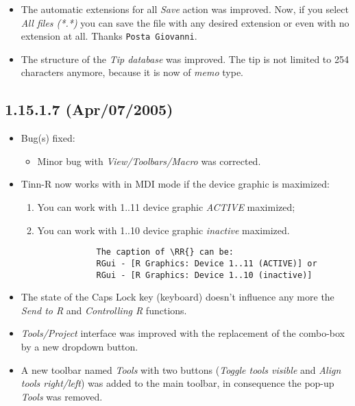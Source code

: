 \begin{itemize}
  \item The automatic extensions for all \textit{Save} action was
    improved. Now, if you select \textit{All files (*.*)} you can
    save the file with any desired extension or even with no
    extension at all. Thanks \texttt{Posta Giovanni}.
  \item The structure of the \textit{Tip database} was improved.
    The tip is not limited to 254 characters anymore, because it is
    now of \textit{memo} type.
\end{itemize}


\subsection*{1.15.1.7 (Apr/07/2005)}
\begin{itemize}
  \item Bug(s) fixed:
    \begin{itemize}
      \item Minor bug with \textit{View/Toolbars/Macro} was corrected.
    \end{itemize}
  \item Tinn-R now works with \RR{} in MDI mode if the device graphic is maximized:
    \begin{enumerate}
      \item You can work with 1..11 device graphic \textit{ACTIVE} maximized;
      \item You can work with 1..10 device graphic \textit{inactive} maximized.
        \begin{footnotesize}
          \begin{verbatim}
            The caption of \RR{} can be:
            RGui - [R Graphics: Device 1..11 (ACTIVE)] or
            RGui - [R Graphics: Device 1..10 (inactive)]
          \end{verbatim}
        \end{footnotesize}
    \end{enumerate}
  \item The state of the Caps Lock key (keyboard) doesn't influence any more the \textit{Send to R} and
    \textit{Controlling R} functions.
  \item \textit{Tools/Project} interface was improved with the replacement of the combo-box by a new dropdown button.
  \item A new toolbar named \textit{Tools} with two buttons (\textit{Toggle tools visible} and
    \textit{Align tools right/left}) was added to the main toolbar, in consequence the pop-up \textit{Tools} was removed.

\end{itemize}
